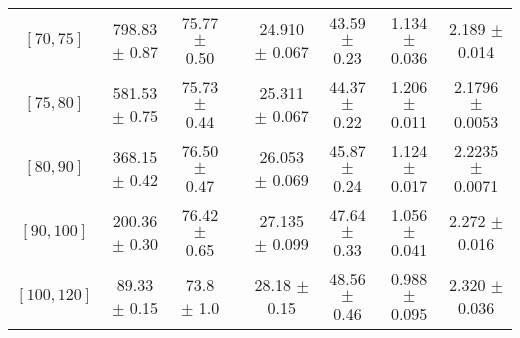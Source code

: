 \begin{tabular}{c||c|c|c|c|c|c|c}
$[70, 75]$ & 798.83 $\pm$ 0.87 & 75.77 $\pm$ 0.50 &  & 24.910 $\pm$ 0.067 & 43.59 $\pm$ 0.23 & 1.134 $\pm$ 0.036 & 2.189 $\pm$ 0.014\\
$[75, 80]$ & 581.53 $\pm$ 0.75 & 75.73 $\pm$ 0.44 &  & 25.311 $\pm$ 0.067 & 44.37 $\pm$ 0.22 & 1.206 $\pm$ 0.011 & 2.1796 $\pm$ 0.0053\\
$[80, 90]$ & 368.15 $\pm$ 0.42 & 76.50 $\pm$ 0.47 &  & 26.053 $\pm$ 0.069 & 45.87 $\pm$ 0.24 & 1.124 $\pm$ 0.017 & 2.2235 $\pm$ 0.0071\\
$[90, 100]$ & 200.36 $\pm$ 0.30 & 76.42 $\pm$ 0.65 &  & 27.135 $\pm$ 0.099 & 47.64 $\pm$ 0.33 & 1.056 $\pm$ 0.041 & 2.272 $\pm$ 0.016\\
$[100, 120]$ & 89.33 $\pm$ 0.15 & 73.8 $\pm$ 1.0 &  & 28.18 $\pm$ 0.15 & 48.56 $\pm$ 0.46 & 0.988 $\pm$ 0.095 & 2.320 $\pm$ 0.036\\
\end{tabular}

